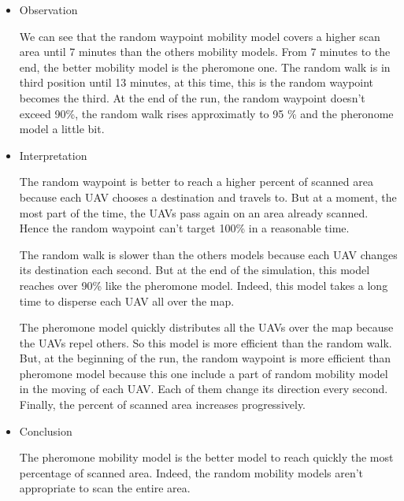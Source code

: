 \begin{itemize}

\item Observation

We can see that the random waypoint mobility model covers a higher scan area until 7 minutes than the others mobility models. From 7 minutes to the end, the better mobility model is the pheromone one. The random walk is in third position until 13 minutes, at this time, this is the random waypoint becomes the third. At the end of the run, the random waypoint doesn't exceed 90\%, the random walk rises approximatly to 95 \% and the pheronome model a little bit.

\item Interpretation

The random waypoint is better to reach a higher percent of scanned area because each UAV chooses a destination and travels to. But at a moment, the most part of the time, the UAVs pass again on an area already scanned. Hence the random waypoint can't target 100\% in a reasonable time.

The random walk is slower than the others models because each UAV changes its destination each second. But at the end of the simulation, this model reaches over 90\% like the pheromone model. Indeed, this model takes a long time to disperse each UAV all over the map.

The pheromone model quickly distributes all the UAVs over the map because the UAVs repel others. So this model is more efficient than the random walk. But, at the beginning of the run, the random waypoint is more efficient than pheromone model because this one include a part of random mobility model in the moving of each UAV. Each of them change its direction every second. Finally, the percent of scanned area increases progressively.

\item Conclusion

The pheromone mobility model is the better model to reach quickly the most percentage of scanned area. Indeed, the random mobility models aren't appropriate to scan the entire area.

\end{itemize}

